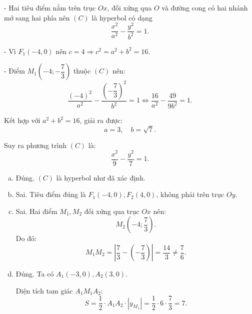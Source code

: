 \begin{ex}
{- Hai tiêu điểm nằm trên trục $Ox$, đối xứng qua $O$ và đường cong có hai nhánh mở sang hai phía nên $(C)$ là hyperbol có dạng
$$\dfrac{x^2}{a^2}-\dfrac{y^2}{b^2}=1.$$

- Vì $F_1(-4,0)$ nên $c=4 \Rightarrow c^2=a^2+b^2=16.$

- Điểm $M_1\left(-4;-\dfrac{7}{3}\right)$ thuộc $(C)$ nên:
$$\dfrac{(-4)^2}{a^2}-\dfrac{\left(-\dfrac{7}{3}\right)^2}{b^2}=1
\Leftrightarrow \dfrac{16}{a^2}-\dfrac{49}{9b^2}=1.$$

Kết hợp với $a^2+b^2=16$, giải ra được:
$$a=3,\quad b=\sqrt{7}.$$

Suy ra phương trình $(C)$ là:
$$\dfrac{x^2}{9}-\dfrac{y^2}{7}=1.$$

\begin{enumerate}[a)]
    \item Đúng. $(C)$ là hyperbol như đã xác định.
    
    \item Sai. Tiêu điểm đúng là $F_1(-4,0), F_2(4,0)$, không phải trên trục $Oy$.
    
    \item Sai. Hai điểm $M_1, M_2$ đối xứng qua trục $Ox$ nên:
    $$M_2\left(-4;\dfrac{7}{3}\right).$$
    Do đó:
    $$M_1M_2=\left|\dfrac{7}{3}-\left(-\dfrac{7}{3}\right)\right|=\dfrac{14}{3}\ne \dfrac{7}{6}.$$
    
    \item Đúng. Ta có $A_1(-3,0), A_2(3,0)$.
    
    Diện tích tam giác $A_1M_1A_2$:
    $$S=\dfrac{1}{2}\cdot A_1A_2 \cdot |y_{M_1}|
    =\dfrac{1}{2}\cdot 6 \cdot \dfrac{7}{3}=7.$$
\end{enumerate}
}
\end{ex}

